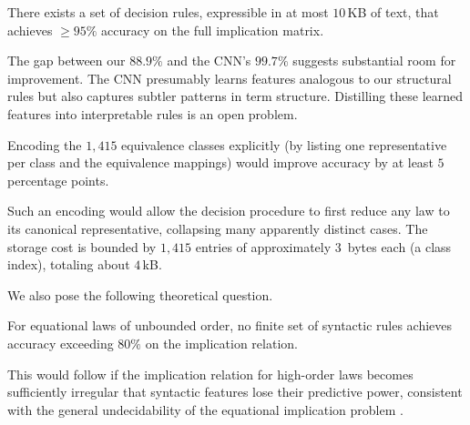 \begin{conjecture}\label{conj:95}
There exists a set of decision rules, expressible in at most $10$\,KB of text,
that achieves $\ge 95\%$ accuracy on the full implication matrix.
\end{conjecture}

The gap between our $88.9\%$ and the CNN's $99.7\%$ \cite{ETP2025} suggests
substantial room for improvement.  The CNN presumably learns features analogous
to our structural rules but also captures subtler patterns in term structure.
Distilling these learned features into interpretable rules is an open problem.

\begin{conjecture}\label{conj:equivalence}
Encoding the $1{,}415$ equivalence classes explicitly (by listing one
representative per class and the equivalence mappings) would improve accuracy
by at least $5$ percentage points.
\end{conjecture}

Such an encoding would allow the decision procedure to first reduce any law
to its canonical representative, collapsing many apparently distinct cases.
The storage cost is bounded by $1{,}415$ entries of approximately $3$~bytes
each (a class index), totaling about $4$\,kB.

We also pose the following theoretical question.

\begin{conjecture}\label{conj:undecidability}
For equational laws of unbounded order, no finite set of syntactic rules
achieves accuracy exceeding $80\%$ on the implication relation.
\end{conjecture}

This would follow if the implication relation for high-order laws becomes
sufficiently irregular that syntactic features lose their predictive power,
consistent with the general undecidability of the equational implication
problem \cite{McNulty1976}.
